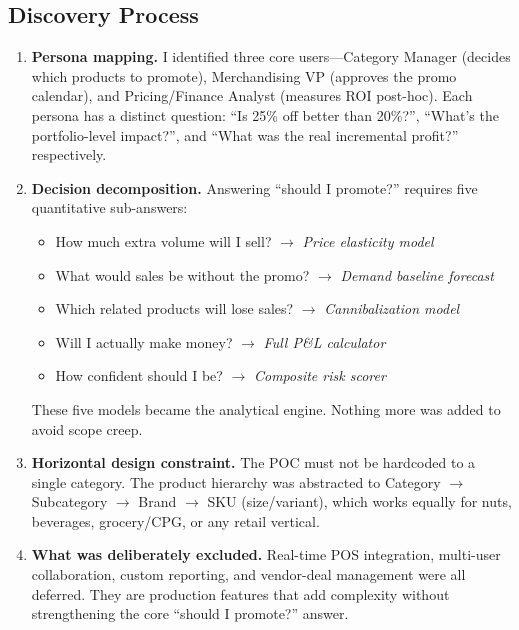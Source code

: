 \documentclass[11pt, a4paper]{article}
\begin{document}
\subsection{Discovery Process}
\begin{enumerate}[leftmargin=1.5em]
    \item \textbf{Persona mapping.} I identified three core users---Category Manager (decides which products to promote), Merchandising VP (approves the promo calendar), and Pricing/Finance Analyst (measures ROI post-hoc). Each persona has a distinct question: ``Is 25\% off better than 20\%?'', ``What's the portfolio-level impact?'', and ``What was the real incremental profit?'' respectively.

    \item \textbf{Decision decomposition.} Answering ``should I promote?'' requires five quantitative sub-answers:
    \begin{itemize}[leftmargin=1em]
        \item How much extra volume will I sell? $\rightarrow$ \textit{Price elasticity model}
        \item What would sales be without the promo? $\rightarrow$ \textit{Demand baseline forecast}
        \item Which related products will lose sales? $\rightarrow$ \textit{Cannibalization model}
        \item Will I actually make money? $\rightarrow$ \textit{Full P\&L calculator}
        \item How confident should I be? $\rightarrow$ \textit{Composite risk scorer}
    \end{itemize}
    These five models became the analytical engine. Nothing more was added to avoid scope creep.

    \item \textbf{Horizontal design constraint.} The POC must not be hardcoded to a single category. The product hierarchy was abstracted to Category $\rightarrow$ Subcategory $\rightarrow$ Brand $\rightarrow$ SKU (size/variant), which works equally for nuts, beverages, grocery/CPG, or any retail vertical.

    \item \textbf{What was deliberately excluded.} Real-time POS integration, multi-user collaboration, custom reporting, and vendor-deal management were all deferred. They are production features that add complexity without strengthening the core ``should I promote?'' answer.
\end{enumerate}
\end{document}
